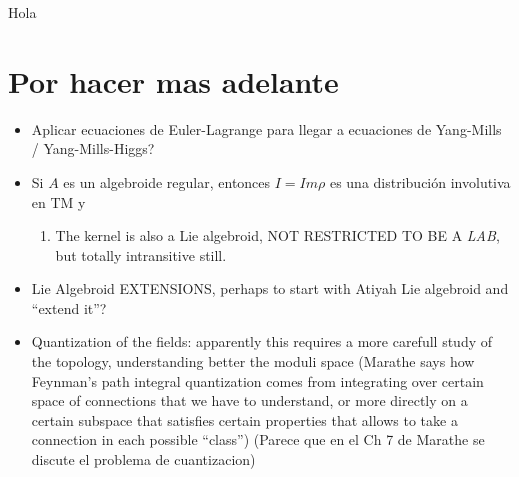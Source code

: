 Hola \cite{Reyes2013}

\section{Por hacer mas adelante}
\begin{itemize}
    \item Aplicar ecuaciones de Euler-Lagrange para llegar a ecuaciones de Yang-Mills / Yang-Mills-Higgs?
    
    \item Si $A$ es un algebroide regular, entonces $I = Im \rho$ es una distribución involutiva en TM y 
    
    \begin{enumerate}
        \item The kernel is also a Lie algebroid, NOT RESTRICTED TO BE A \emph{LAB}, but totally intransitive still.
    \end{enumerate}
    
    
    \item Lie Algebroid EXTENSIONS, perhaps to start with Atiyah Lie algebroid and ``extend it''?
    
    \item Quantization of the fields: apparently this requires a more carefull study of the topology, understanding better the moduli space (Marathe says how Feynman's path integral quantization comes from integrating over certain space of connections that we have to understand, or more directly on a certain subspace that satisfies certain properties that allows to take a connection in each possible ``class'') (Parece que en el Ch 7 de Marathe se discute el problema de cuantizacion)
\end{itemize}